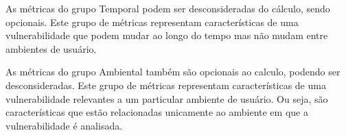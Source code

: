 %
As métricas do grupo Temporal podem ser desconsideradas do cálculo, sendo opcionais. Este grupo de métricas representam características de uma vulnerabilidade que podem mudar ao longo do tempo mas não mudam entre ambientes de usuário.



%

As métricas do grupo Ambiental também são opcionais ao calculo, podendo ser desconsideradas. Este grupo de métricas representam características de uma vulnerabilidade relevantes a um particular ambiente de usuário. Ou seja, são características que estão relacionadas unicamente ao ambiente em que a vulnerabilidade é analisada.
%  

%




